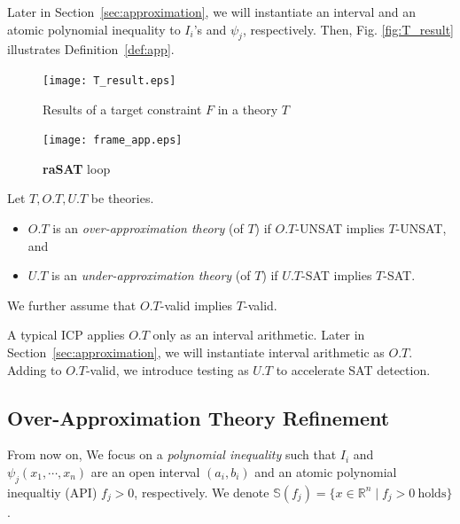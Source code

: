 \documentclass[runningheads,a4paper,oribibl]{llncs}
\newcommand{\Real}{{\mathbb R}}
\begin{document}
Later in Section~\ref{sec:approximation}, we will instantiate an interval and 
an atomic polynomial inequality to $I_i$'s and $\psi_j$, respectively.
Then, Fig. \ref{fig:T_result} illustrates Definition~\ref{def:app}. 
\begin{figure} [ht]
\centering
\begin{minipage}[b]{0.45\linewidth}
  \texttt{[image: T\_result.eps]}
\caption{Results of a target constraint $F$ in a theory $T$}
\label{fig:T_result}
\end{minipage}
\quad
\begin{minipage}[b]{0.45\linewidth}
   \texttt{[image: frame\_app.eps]}
\caption{{\bf raSAT} loop}
\label{fig:frame}
\end{minipage}

\end{figure}

\begin{definition} \label{def:ApproxTheory}
Let $T, O.T, U.T$ be theories. 
\begin{itemize}
\item $O.T$ is an {\em over-approximation theory} (of $T$) 
if $O.T$-UNSAT implies $T$-UNSAT, and
\item $U.T$ is an {\em under-approximation theory} (of $T$)
if $U.T$-SAT implies $T$-SAT. 
\end{itemize}
We further assume that $O.T$-valid implies $T$-valid. 
\end{definition}

A typical ICP applies $O.T$ only as an interval arithmetic. 
Later in Section~\ref{sec:approximation}, we will instantiate interval arithmetic as $O.T$. 
Adding to $O.T$-valid, we introduce testing as $U.T$ to accelerate SAT detection. 



\subsection{Over-Approximation Theory Refinement}
\label{sec:soundness}

From now on, We focus on a \emph{polynomial inequality} such that 
$I_i$ and $\psi_j(x_1,\cdots,x_n)$ are an open interval $(a_i,b_i)$ and 
an atomic polynomial inequaltiy (API) $f_j > 0$, respectively. 
We denote $\mathbb{S}(f_j) = \{x \in \Real^n \mid f_j > 0 ~\text{holds}\}$.
\end{document}
